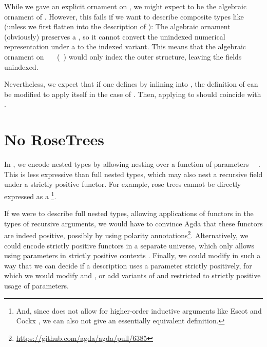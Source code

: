 While we gave an explicit ornament  on , we might expect  to be the algebraic ornament of . However, this fails if we want to describe composite types like  (unless we first flatten  into the description of ): The algebraic ornament (obviously) preserves a , so it cannot convert the unindexed numerical representation under a  to the indexed variant. This means that the algebraic ornament on \ \AV{=}\ \ (\ ) would only index the outer structure, leaving the  fields unindexed.

Nevertheless, we expect that if one defines  by inlining  into , the definition of  can be modified to apply itself in the case of . Then, applying  to  should coincide with .


\section{No RoseTrees}
In , we encode nested types by allowing nesting over a function of parameters \ \ . This is less expressive than full nested types, which may also nest a recursive field under a strictly positive functor. For example, rose trees
cannot be directly expressed as a \footnote{And, since  does not allow for higher-order inductive arguments like Escot and Cockx \cite{practgen}, we can also not give an essentially equivalent definition.}.


If we were to describe full nested types, allowing applications of functors in the types of recursive arguments, we would have to convince Agda that these functors are indeed positive, possibly by using polarity annotations\footnote{\url{https://github.com/agda/agda/pull/6385}}. Alternatively, we could encode strictly positive functors in a separate universe, which only allows using parameters in strictly positive contexts \cite{sijsling}. Finally, we could modify  in such a way that we can decide if a description uses a parameter strictly positively, for which we would modify  and , or add variants of  and  restricted to strictly positive usage of parameters.


